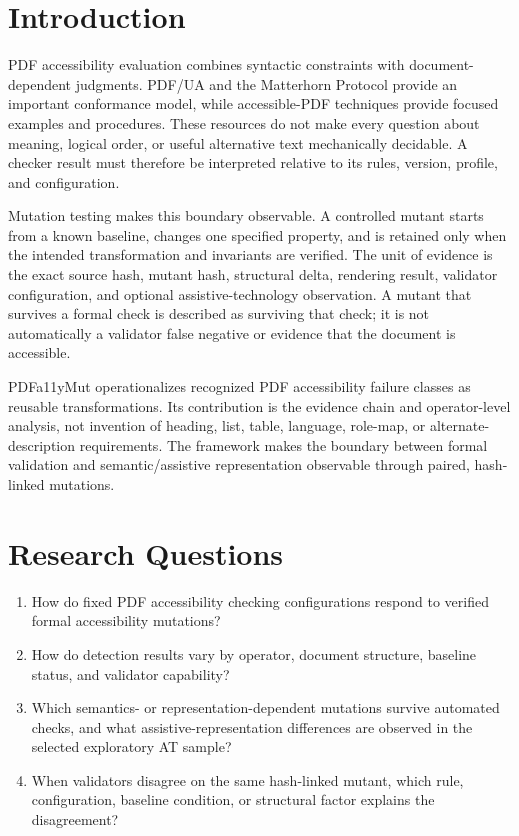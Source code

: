 \documentclass[conference]{IEEEtran}
\newcommand{\taggedsection}[1]{%
  \tagstructbegin{tag=H1}\tagmcbegin{tag=H1}\section{#1}\tagmcend\tagstructend}
\newenvironment{taggedparagraph}{%
  \tagstructbegin{tag=P}\tagmcbegin{tag=P}%
}{%
  \tagmcend\tagstructend%
}
\begin{document}
\taggedsection{Introduction}
\begin{taggedparagraph}
PDF accessibility evaluation combines syntactic constraints with document-dependent judgments. PDF/UA and the Matterhorn Protocol provide an important conformance model, while accessible-PDF techniques provide focused examples and procedures. These resources do not make every question about meaning, logical order, or useful alternative text mechanically decidable. A checker result must therefore be interpreted relative to its rules, version, profile, and configuration.
\end{taggedparagraph}

\begin{taggedparagraph}
Mutation testing makes this boundary observable. A controlled mutant starts from a known baseline, changes one specified property, and is retained only when the intended transformation and invariants are verified. The unit of evidence is the exact source hash, mutant hash, structural delta, rendering result, validator configuration, and optional assistive-technology observation. A mutant that survives a formal check is described as surviving that check; it is not automatically a validator false negative or evidence that the document is accessible.
\end{taggedparagraph}

\begin{taggedparagraph}
PDFa11yMut operationalizes recognized PDF accessibility failure classes as reusable transformations. Its contribution is the evidence chain and operator-level analysis, not invention of heading, list, table, language, role-map, or alternate-description requirements. The framework makes the boundary between formal validation and semantic/assistive representation observable through paired, hash-linked mutations.
\end{taggedparagraph}

\taggedsection{Research Questions}
\begin{enumerate}
\item {}How do fixed PDF accessibility checking configurations respond to verified formal accessibility mutations?\tagmcend\tagstructend\tagstructend
\item {}How do detection results vary by operator, document structure, baseline status, and validator capability?\tagmcend\tagstructend\tagstructend
\item {}Which semantics- or representation-dependent mutations survive automated checks, and what assistive-representation differences are observed in the selected exploratory AT sample?\tagmcend\tagstructend\tagstructend
\item {}When validators disagree on the same hash-linked mutant, which rule, configuration, baseline condition, or structural factor explains the disagreement?\tagmcend\tagstructend\tagstructend
\end{enumerate}
\tagstructend
\end{document}
